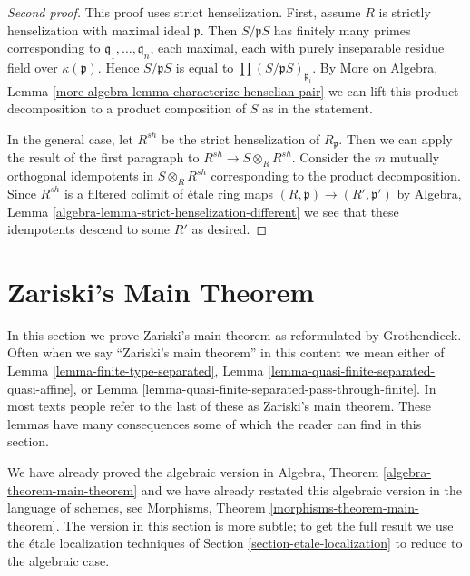 \begin{proof}[Second proof]
This proof uses strict henselization. First, assume $R$ is strictly
henselization with maximal ideal $\mathfrak p$. Then $S/\mathfrak p S$
has finitely many primes corresponding to
$\mathfrak q_1, \ldots, \mathfrak q_n$, each maximal,
each with purely inseparable residue field over $\kappa(\mathfrak p)$.
Hence $S/\mathfrak p S$ is equal to $\prod (S/\mathfrak p S)_{\mathfrak p_i}$.
By More on Algebra, Lemma \ref{more-algebra-lemma-characterize-henselian-pair}
we can lift this product decomposition to a product composition of $S$
as in the statement.

\medskip\noindent
In the general case, let $R^{sh}$ be the strict henselization of
$R_\mathfrak p$. Then we can apply the result of the first paragraph
to $R^{sh} \to S \otimes_R R^{sh}$. Consider the $m$ mutually orthogonal
idempotents in $S \otimes_R R^{sh}$ corresponding to the product
decomposition. Since $R^{sh}$ is a filtered colimit of \'etale
ring maps $(R, \mathfrak p) \to (R', \mathfrak p')$ by
Algebra, Lemma \ref{algebra-lemma-strict-henselization-different}
we see that these idempotents descend to some $R'$ as desired.
\end{proof}







\section{Zariski's Main Theorem}
\label{section-application-etale-neighbourhoods}

\noindent
In this section we prove Zariski's main theorem as reformulated by Grothendieck.
Often when we say ``Zariski's main theorem'' in this content we mean either of
Lemma \ref{lemma-finite-type-separated},
Lemma \ref{lemma-quasi-finite-separated-quasi-affine}, or
Lemma \ref{lemma-quasi-finite-separated-pass-through-finite}.
In most texts people refer to the last of these as
Zariski's main theorem. These lemmas have many consequences
some of which the reader can find in this section.

\medskip\noindent
We have already proved the algebraic version in
Algebra, Theorem \ref{algebra-theorem-main-theorem}
and we have already restated this algebraic version
in the language of schemes, see
Morphisms, Theorem \ref{morphisms-theorem-main-theorem}.
The version in this section is more subtle; to get the full
result we use the \'etale localization techniques
of Section \ref{section-etale-localization} to reduce to
the algebraic case.

